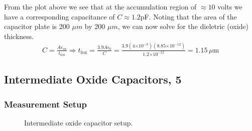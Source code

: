 \documentclass{article}
\providecommand{\e}[1]{\ensuremath{\times 10^{#1}}}
\begin{document}
From the plot above we see that at the accumulation region of $\approx 10$ volts we have a corresponding capacitance of $C \approx 1.2$pF. Noting that the area of the capacitor plate is 200 $\mu m$ by 200 $\mu m$, we can now solve for the dieletric (oxide) thickness.
\begin{align*}
C = \frac{A \epsilon_{\text{ox}}}{t_{\text{fox}}} \Rightarrow t_{\text{fox}} = \frac{3.9 A \epsilon_0}{C} = \frac{3.9 (4\e{-8}) (8.85\e{-12})}{1.2 \e{-12}} = 1.15 \,\mu\text{m}
\end{align*}

\subsection{Intermediate Oxide Capacitors, 5} %

\subsubsection{Measurement Setup}
\begin{figure}[H]
\centering
{}
\caption{Intermediate oxide capacitor setup.}
\end{figure}
\end{document}
